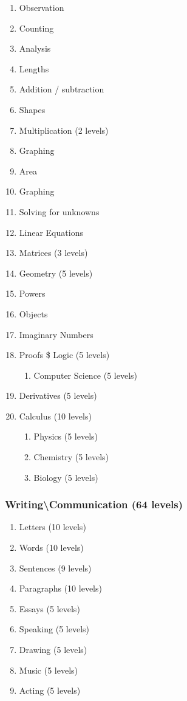 \documentclass[CSHFoundation.tex]{subfiles}
\begin{document}
\begin{enumerate}
\item Observation
\item Counting
\item Analysis
\item Lengths
\item Addition / subtraction
\item Shapes
\item Multiplication (2 levels)
\item Graphing
\item Area
\item Graphing
\item Solving for unknowns
\item Linear Equations
\item Matrices (3 levels)
\item Geometry (5 levels)
\item Powers
\item Objects
\item Imaginary Numbers
\item Proofs \$ Logic (5 levels)
\begin{enumerate}
	\item Computer Science (5 levels)
\end{enumerate}\item Derivatives (5 levels)
\item Calculus (10 levels)
\begin{enumerate}
	\item Physics (5 levels)
	\item Chemistry (5 levels)
	\item Biology (5 levels)
\end{enumerate}\end{enumerate}



\subsubsection{Writing\textbackslash Communication (64 levels)}

\begin{enumerate}
\item Letters (10 levels)
\item Words (10 levels)
\item Sentences (9 levels)
\item Paragraphs (10 levels)
\item Essays (5 levels)
\item Speaking (5 levels)
\item Drawing (5 levels)
\item Music (5 levels)
\item Acting (5 levels)
\end{enumerate}
\end{document}
